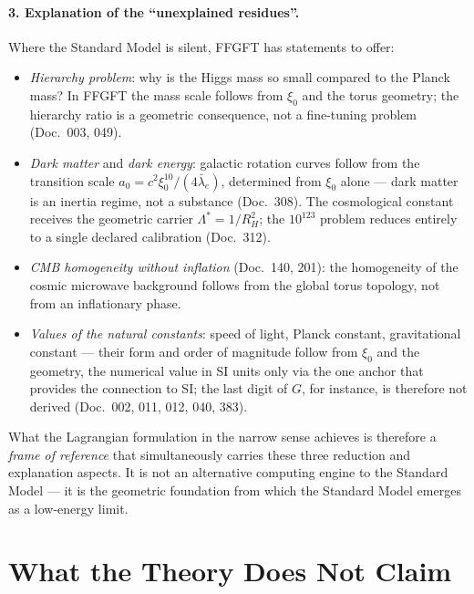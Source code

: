 \paragraph{3. Explanation of the \enquote{unexplained residues}.}
Where the Standard Model is silent, FFGFT has statements to offer:
\begin{itemize}\setlength\itemsep{0pt}
  \item \emph{Hierarchy problem}: why is the Higgs mass so small
        compared to the Planck mass? In FFGFT the mass scale follows
        from $\xi_0$ and the torus geometry; the hierarchy ratio is
        a geometric consequence, not a fine-tuning problem
        (Doc.~003, 049).
  \item \emph{Dark matter} and \emph{dark energy}: galactic rotation
        curves follow from the transition scale
        $a_0 = c^2\xi_0^{10}/(4\bar\lambda_e)$, determined from
        $\xi_0$ alone --- dark matter is an inertia regime, not a
        substance (Doc.~308). The cosmological constant receives the
        geometric carrier $\Lambda^* = 1/R_H^2$; the $10^{123}$
        problem reduces entirely to a single declared calibration
        (Doc.~312).
  \item \emph{CMB homogeneity without inflation} (Doc.~140, 201):
        the homogeneity of the cosmic microwave background follows
        from the global torus topology, not from an inflationary
        phase.
  \item \emph{Values of the natural constants}: speed of light,
        Planck constant, gravitational constant --- their form and
        order of magnitude follow from $\xi_0$ and the geometry, the
        numerical value in SI units only via the one anchor that
        provides the connection to SI; the last digit of $G$, for
        instance, is therefore not derived (Doc.~002, 011, 012, 040,
        383).
\end{itemize}

What the Lagrangian formulation in the narrow sense achieves is
therefore a \emph{frame of reference} that simultaneously carries
these three reduction and explanation aspects. It is not an
alternative computing engine to the Standard Model --- it is the
geometric foundation from which the Standard Model emerges as a
low-energy limit.

\section{What the Theory Does Not Claim}

